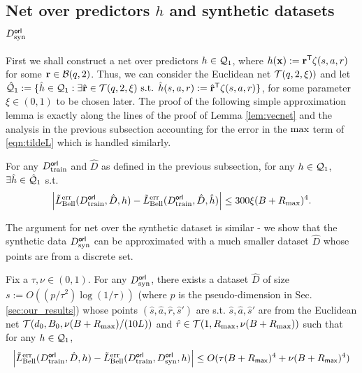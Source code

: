 \subsection{Net over predictors $h$ and synthetic datasets $D^{\sf orl}_{\textnormal{syn}}$}\label{sec:net-orl}
First we shall construct a net over predictors  $h \in \mathcal{Q}_1$, where $h({\mathbf{x}}) := {\mathbf{r}}^{\sf T}\zeta(s,a,r)$ for some ${\mathbf{r}} \in \mathcal{B}(q,2)$. Thus, we can consider the Euclidean net $\mathcal{T}(q, 2, \xi))$ and let $\hat{\mathcal{Q}}_1 := \{\hat{h} \in \mathcal{Q}_1 : \exists \hat{{\mathbf{r}}} \in \mathcal{T}(q, 2, \xi)\textnormal{ s.t. } \hat{h}(s,a,r) := \hat{{\mathbf{r}}}^{\sf T}\zeta(s,a,r)\}$, for some parameter $\xi \in (0,1)$ to be chosen later. The proof of the following simple approximation lemma  is exactly along the lines of the proof of Lemma \ref{lem:vecnet} and the analysis in the previous subsection accounting for the error in the $\textnormal{max}$ term of \eqref{eqn:tildeL} which is handled similarly. 
\begin{lemma} \label{lem:vecnet-orl}
    For any $D^{\sf orl}_{\textnormal{train}}$ and $\hat{D}$ as defined in the previous subsection, for any $h \in \mathcal{Q}_1$, $\exists \hat{h} \in \hat{\mathcal{Q}}_1$ s.t. 
    \begin{equation}
        \left|\tilde{L}^{\textnormal{err}}_{\textnormal{Bell}}(D^{\sf orl}_{\textnormal{train}}, \hat{D}, h) - \tilde{L}^{\textnormal{err}}_{\textnormal{Bell}}(D^{\sf orl}_{\textnormal{train}}, \hat{D}, \hat{h}) \right| \leq  300\xi(B+R_{\textnormal{max}})^4.
    \end{equation}
\end{lemma}
The argument for net over the synthetic dataset is similar - we show that the synthetic data $D^{\sf orl}_{\textnormal{syn}}$ can be approximated with a much smaller dataset  $\hat{D}$ whose points are from a discrete set.
\begin{lemma}\label{lem:datasetnet-orl}
    Fix a $\tau, \nu \in (0,1)$. For any $D^{\sf orl}_{\textnormal{syn}}$, there exists a dataset $\hat{D}$ of size $s := O((p/\tau^2)\log(1/\tau))$ (where $p$ is the pseudo-dimension in Sec. \ref{sec:our_results}) whose points $(\hat{s}, \hat{a}, \hat{r}, \hat{s}')$ are s.t. $\hat{s}, \hat{a}, \hat{s}'$ are from the Euclidean net $\mathcal{T}(d_0, B_0, \nu(B+R_\textnormal{max})/(10L))$ and $\hat{r} \in \mathcal{T}(1, R_{\textnormal{max}},  \nu(B+R_\textnormal{max}))$ such that for any $h \in \mathcal{Q}_1$,
    \begin{equation}
        \left|\tilde{L}^{\textnormal{err}}_{\textnormal{Bell}}(D^{\sf orl}_{\textnormal{train}}, \hat{D}, h) - \tilde{L}^{\textnormal{err}}_{\textnormal{Bell}}(D^{\sf orl}_{\textnormal{train}}, D^{\sf orl}_{\textnormal{syn}}, h)\right| \leq O(\tau(B+R_{\sf max})^4 + \nu(B+R_{\sf max})^4)
    \end{equation}
    \end{lemma}
